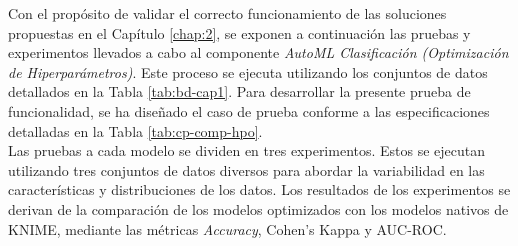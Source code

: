 Con el propósito de validar el correcto funcionamiento de las soluciones propuestas en el Capítulo \ref{chap:2}, se exponen a continuación las pruebas y experimentos llevados a cabo al componente \textit{AutoML Clasificación (Optimización de Hiperparámetros)}. Este proceso se ejecuta utilizando los conjuntos de datos detallados en la Tabla \ref{tab:bd-cap1}. Para desarrollar la presente prueba de funcionalidad, se ha diseñado el caso de prueba conforme a las especificaciones detalladas en la Tabla \ref{tab:cp-comp-hpo}. \\
Las pruebas a cada modelo se dividen en tres experimentos. Estos se ejecutan utilizando tres conjuntos de datos diversos para abordar la variabilidad en las características y distribuciones de los datos. Los resultados de los experimentos se derivan de la comparación de los modelos optimizados con los modelos nativos de KNIME, mediante las métricas \textit{Accuracy}, Cohen’s Kappa y AUC-ROC.


